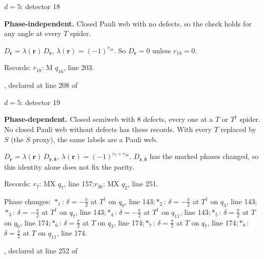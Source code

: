\label{d5_det018}
{\Large $d=5$: detector 18}\par
\textbf{Phase-independent.} Closed Pauli web with no defects, so the check holds for any angle at every $T$ spider.
\begin{center}
\end{center}
\vspace{-1mm}
$D_{\boldsymbol r}=\lambda(\boldsymbol r)\,D_{\boldsymbol r}$, \quad $\lambda(\boldsymbol r)=(-1)^{r_{18}}$. \qquad So $D_{\boldsymbol r}=0$ unless $r_{18}=0$.
\par\smallskip\begin{minipage}{.98\linewidth}\small Records: $r_{18}$: M $q_{16}$, line 203.\end{minipage}
\vfill
{\footnotesize\texttt{}, declared at line 208 of \texttt{}}
\newpage

\label{d5_det019}
{\Large $d=5$: detector 19}\par
\textbf{Phase-dependent.} Closed semiweb with 8 defects, every one at a $T$ or $T^\dagger$ spider. No closed Pauli web without defects has these records. With every $T$ replaced by $S$ (the $S$ proxy), the same labels are a Pauli web.
\begin{center}
\end{center}
\vspace{-1mm}
$D_{\boldsymbol r}=\lambda(\boldsymbol r)\,D_{\boldsymbol r,\boldsymbol\delta}$, \quad $\lambda(\boldsymbol r)=(-1)^{r_{7}+r_{36}}$. \qquad $D_{\boldsymbol r,\boldsymbol\delta}$ has the marked phases changed, so this identity alone does not fix the parity.
\par\smallskip\begin{minipage}{.98\linewidth}\small Records: $r_{7}$: MX $q_{7}$, line 157;\quad $r_{36}$: MX $q_{2}$, line 251.\end{minipage}
\par\smallskip\begin{minipage}{.98\linewidth}\small Phase changes: $\ast_{1}$: $\delta=-\frac{\pi}{2}$ at $T^\dagger$ on $q_{0}$, line 143;\quad $\ast_{2}$: $\delta=-\frac{\pi}{2}$ at $T^\dagger$ on $q_{3}$, line 143;\quad $\ast_{3}$: $\delta=-\frac{\pi}{2}$ at $T^\dagger$ on $q_{7}$, line 143;\quad $\ast_{4}$: $\delta=-\frac{\pi}{2}$ at $T^\dagger$ on $q_{11}$, line 143;\quad $\ast_{5}$: $\delta=\frac{\pi}{2}$ at $T$ on $q_{0}$, line 174;\quad $\ast_{6}$: $\delta=\frac{\pi}{2}$ at $T$ on $q_{3}$, line 174;\quad $\ast_{7}$: $\delta=\frac{\pi}{2}$ at $T$ on $q_{7}$, line 174;\quad $\ast_{8}$: $\delta=\frac{\pi}{2}$ at $T$ on $q_{11}$, line 174.\end{minipage}
\vfill
{\footnotesize\texttt{}, declared at line 252 of \texttt{}}
\newpage

